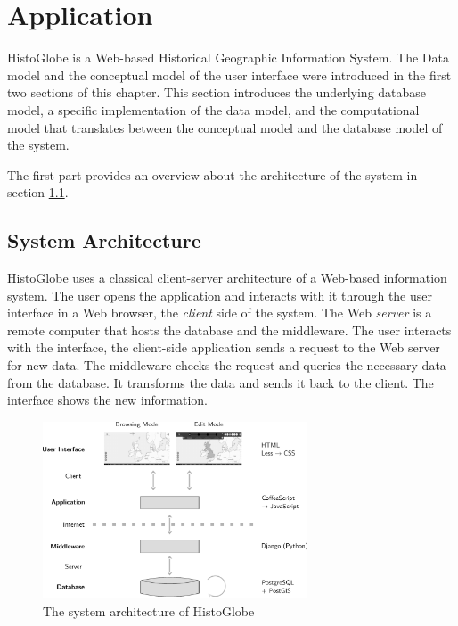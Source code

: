 
\section{Application} %
\label{sec:application}

HistoGlobe is a Web-based Historical Geographic Information System. The Data model and the conceptual model of the user interface were introduced in the first two sections of this chapter. This section introduces the underlying database model, a specific implementation of the data model, and the computational model that translates between the conceptual model and the database model of the system.

The first part provides an overview about the architecture of the system in section \ref{sub:system_architecture}.

\subsection{System Architecture} %
\label{sub:system_architecture}

HistoGlobe uses a classical client-server architecture of a Web-based information system. The user opens the application and interacts with it through the user interface in a Web browser, the \emph{client} side of the system. The Web \emph{server} is a remote computer that hosts the database and the middleware. The user interacts with the interface, the client-side application sends a request to the Web server for new data. The middleware checks the request and queries the necessary data from the database. It transforms the data and sends it back to the client. The interface shows the new information.

\begin{figure}[H]
  \vspace{1em}
  \centering
  \includegraphics[width=0.7\textwidth]{graphics/development/system_architecture}
  \caption{The system architecture of HistoGlobe}
  \label{fig:system_architecture}
\end{figure}

